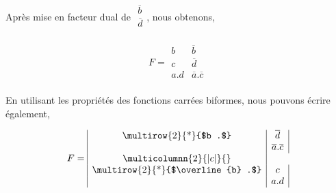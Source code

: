 Après mise en facteur dual de $ \begin{array}{|c|} \overline{b} \\ \overline{d} \\\end{array}$, nous obtenons, 



\[ F = 
\begin{array}{|c|c|}  b & \overline{b} \\ c & \overline{d} \\ a.d & \overline{a} . \overline{c} \\      \end{array}
\]



En utilisant les propriétés des fonctions carrées biformes, nous pouvons écrire également, 



\[ F = 
\begin{array}{|c|c|}  $\multirow{2}{*}{$b .$}$ & \overline{d} \\ & \overline{a} . \overline{c} \\ 
\multicolumnn{2}{|c|}{}  \\
                      $\multirow{2}{*}{$\overline{b} .$}$ & c  \\ & a . d \\ 
                           \end{array}
\]



